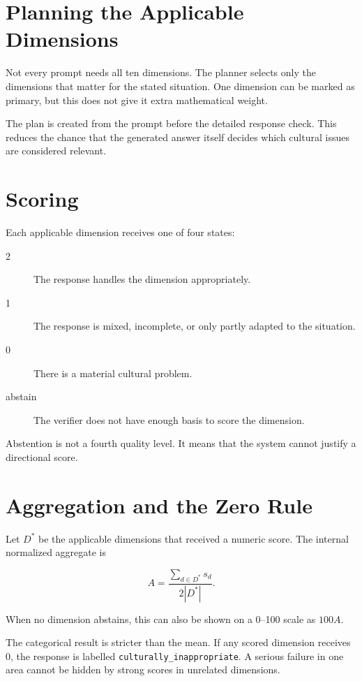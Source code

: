 \section{Planning the Applicable Dimensions}

Not every prompt needs all ten dimensions. The planner selects only the dimensions that matter for the stated situation. One dimension can be marked as primary, but this does not give it extra mathematical weight.

The plan is created from the prompt before the detailed response check. This reduces the chance that the generated answer itself decides which cultural issues are considered relevant.

\section{Scoring}

Each applicable dimension receives one of four states:

\begin{description}
\item[2] The response handles the dimension appropriately.
\item[1] The response is mixed, incomplete, or only partly adapted to the situation.
\item[0] There is a material cultural problem.
\item[abstain] The verifier does not have enough basis to score the dimension.
\end{description}

Abstention is not a fourth quality level. It means that the system cannot justify a directional score.

\section{Aggregation and the Zero Rule}

Let $D^{*}$ be the applicable dimensions that received a numeric score. The internal normalized aggregate is

\[
A = \frac{\sum_{d\in D^{*}} s_d}{2|D^{*}|}.
\]

When no dimension abstains, this can also be shown on a 0--100 scale as $100A$.

The categorical result is stricter than the mean. If any scored dimension receives 0, the response is labelled \texttt{culturally\_inappropriate}. A serious failure in one area cannot be hidden by strong scores in unrelated dimensions.

